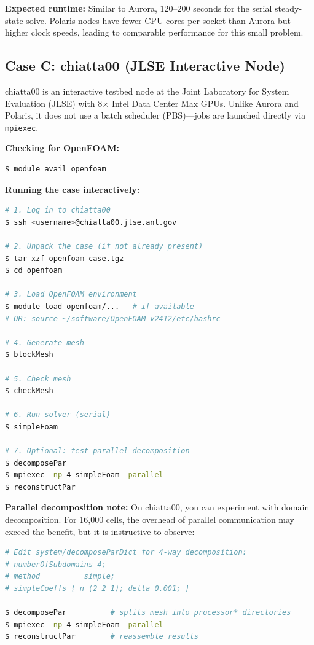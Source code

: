 \documentclass[12pt]{article}
\begin{document}
\textbf{Expected runtime:} Similar to Aurora, $120$--$200$ seconds for the serial steady-state solve. Polaris nodes have fewer CPU cores per socket than Aurora but higher clock speeds, leading to comparable performance for this small problem.

\subsection{Case C: chiatta00 (JLSE Interactive Node)}

chiatta00 is an interactive testbed node at the Joint Laboratory for System Evaluation (JLSE) with 8$\times$ Intel Data Center Max GPUs. Unlike Aurora and Polaris, it does not use a batch scheduler (PBS)---jobs are launched directly via \texttt{mpiexec}.

\textbf{Checking for OpenFOAM:}
\begin{lstlisting}[language=bash]
$ module avail openfoam
\end{lstlisting}

\textbf{Running the case interactively:}
\begin{lstlisting}[language=bash]
# 1. Log in to chiatta00
$ ssh <username>@chiatta00.jlse.anl.gov

# 2. Unpack the case (if not already present)
$ tar xzf openfoam-case.tgz
$ cd openfoam

# 3. Load OpenFOAM environment
$ module load openfoam/...   # if available
# OR: source ~/software/OpenFOAM-v2412/etc/bashrc

# 4. Generate mesh
$ blockMesh

# 5. Check mesh
$ checkMesh

# 6. Run solver (serial)
$ simpleFoam

# 7. Optional: test parallel decomposition
$ decomposePar
$ mpiexec -np 4 simpleFoam -parallel
$ reconstructPar
\end{lstlisting}

\textbf{Parallel decomposition note:} On chiatta00, you can experiment with domain decomposition. For 16,000 cells, the overhead of parallel communication may exceed the benefit, but it is instructive to observe:
\begin{lstlisting}[language=bash]
# Edit system/decomposeParDict for 4-way decomposition:
# numberOfSubdomains 4;
# method          simple;
# simpleCoeffs { n (2 2 1); delta 0.001; }

$ decomposePar          # splits mesh into processor* directories
$ mpiexec -np 4 simpleFoam -parallel
$ reconstructPar        # reassemble results
\end{lstlisting}
\end{document}
